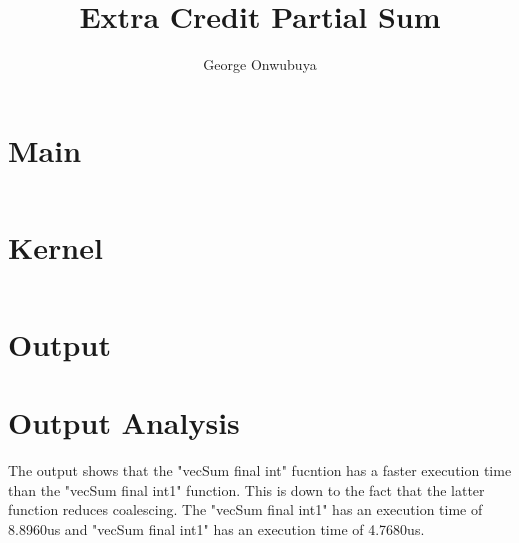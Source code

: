 \documentclass{article}
\title{Extra Credit Partial Sum}
\author{George Onwubuya}
\begin{document}
\maketitle

\section{Main}
\inputminted[breaklines,linenos]{c}{./Partial_Sum.cu}

\section{Kernel}
\inputminted[breaklines,linenos]{c}{./Partial_Sum_Kernel.cu}

\section{Output}
\setlength{\parskip}{1em}

\section{Output Analysis}
The output shows that the "vecSum final int" fucntion has a faster execution time 
than the "vecSum final int1" function. This is down to the fact that the latter function reduces coalescing. The "vecSum final int1" has an execution time of 8.8960us and "vecSum final int1" has an execution time of 4.7680us. 
	
\end{document}
